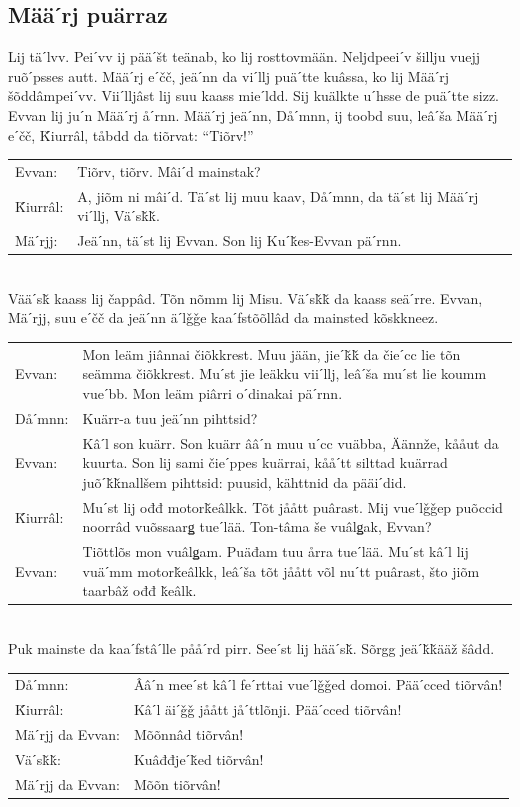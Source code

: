 \documentclass{scrbook}
\begin{document}
\subsection*{Määˊrj puärraz}
Lij täˊlvv. Peiˊvv ij pääˊšt teänab, ko lij rosttovmään. Neljdpeeiˊv šillju vuejj ruõˊpsses autt. Määˊrj eˊčč, jeäˊnn da viˊllj puäˊtte kuâssa, ko lij Määˊrj šõddâmpeiˊvv. Viiˊlljâst lij suu kaass mieˊldd. Sij kuälkte uˊhsse de puäˊtte sizz. Evvan lij juˊn Määˊrj åˊrnn. Määˊrj jeäˊnn, Dåˊmnn, ij toobd suu, leâˊša Määˊrj eˊčč, Ǩiurrâl, tåbdd da tiõrvat: “Tiõrv!”\\

\begin{tabularx}{\textwidth}{l X}
Evvan:&	Tiõrv, tiõrv. Mâiˊd mainstak?\\
Ǩiurrâl:&	A, jiõm ni mâiˊd. Täˊst lij muu kaav, Dåˊmnn, da täˊst lij Määˊrj viˊllj, Väˊsǩǩ.\\
Mäˊrjj:&	Jeäˊnn, täˊst lij Evvan. Son lij Kuˊǩes-Evvan päˊrnn.\\
\end{tabularx}\\

Vääˊsǩ kaass lij čappâd. Tõn nõmm lij Misu. Väˊsǩǩ da kaass seäˊrre. Evvan, Mäˊrjj, suu eˊčč da jeäˊnn äˊlǧǧe kaaˊfstõõllâd da mainsted kõskkneez.\\

\begin{tabularx}{\textwidth}{l X}
Evvan:&	Mon leäm jiânnai čiõkkrest. Muu jään, jieˊǩǩ da čieˊcc lie tõn seämma čiõkkrest. Muˊst jie leäkku viiˊllj, leâˊša muˊst lie koumm vueˊbb. Mon leäm piârri oˊdinakai päˊrnn.\\
Dåˊmnn:&	Kuärr-a tuu jeäˊnn pihttsid?\\
Evvan:&	Kâˊl son kuärr. Son kuärr ââˊn muu uˊcc vuäbba, Äännže, kååut da kuurta. Son lij sami čieˊppes kuärrai, kååˊtt silttad kuärrad juõˊǩǩnallšem pihttsid: puusid, kähttnid da pääiˊdid.\\
Ǩiurrâl:&	Muˊst lij ođđ motorǩeâlkk. Tõt jåått puârast. Mij vueˊlǧǧep puõccid noorrâd vuõssaarǥ tueˊlää. Ton-tâma še vuâlǥak, Evvan?\\
Evvan:&	Tiõttlõs mon vuâlǥam. Puäđam tuu årra tueˊlää. Muˊst kâˊl lij vuäˊmm motorǩeâlkk, leâˊša tõt jåått võl nuˊtt puârast, što jiõm taarbâž ođđ ǩeâlk.\\
\end{tabularx}\\

Puk mainste da kaaˊfstâˊlle pååˊrd pirr. Seeˊst lij hääˊsǩ. Sõrgg jeäˊǩǩääž šâdd.\\

\begin{tabularx}{\textwidth}{l X}
Dåˊmnn:&	Ââˊn meeˊst kâˊl feˊrttai vueˊlǧǧed domoi. Pääˊcced tiõrvân!\\
Ǩiurrâl:&	Kâˊl äiˊǧǧ jåått jåˊttlõnji. Pääˊcced tiõrvân!\\
Mäˊrjj da Evvan:&	Mõõnnâd tiõrvân!\\
Väˊsǩǩ:&	Kuâđđjeˊǩed tiõrvân!\\
Mäˊrjj da Evvan:&	Mõõn tiõrvân!\\
\end{tabularx}
\end{document}

